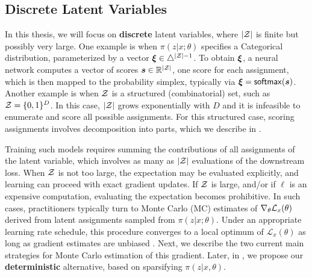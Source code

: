 \subsection{Discrete Latent Variables}\label{sec:discrete_lvm_bg}

\noindent In this thesis, we will focus on \textbf{discrete} latent variables, where
$|\mathcal{Z}|$ is finite but possibly very large. One example is when
$\pi(z|x;\theta)$ specifies a Categorical distribution, parameterized by a
vector $\bm{\xi} \in \triangle^{|\mathcal{Z}|-1}$. To obtain $\bm{\xi}$, a neural network
computes a vector of scores $\bm{s} \in \mathbb{R}^{|\mathcal{Z}|}$, one score
for each assignment, which is then mapped to the probability simplex,
typically via $\bm{\xi} = \operatorname*{\mathsf{softmax}}(\bm{s})$. Another example is when $\mathcal{Z}$ is
a structured (combinatorial) set, such as $\mathcal{Z} = \{0, 1\}^D$. In this
case, $|\mathcal{Z}|$ grows exponentially with $D$ and it is infeasible to
enumerate and score all possible assignments. For this structured
case, scoring assignments involves decomposition into parts, which
we describe in .

Training such models requires summing the contributions of all
assignments of the latent variable, which involves as many as $|\mathcal{Z}|$
evaluations of the downstream loss. When $\mathcal{Z}$ is not too large, the
expectation may be evaluated explicitly, and learning can proceed
with exact gradient updates. If $\mathcal{Z}$ is large, and/or if $\ell$ is
an expensive computation, evaluating the expectation becomes
prohibitive. In such cases, practitioners typically turn to Monte Carlo (MC)
estimates of $\nabla_\theta \mathcal{L}_x(\theta)$ derived from latent
assignments sampled from $\pi(z|x;\theta)$. Under an appropriate
learning rate schedule, this procedure converges to a local optimum
of $\mathcal L_x(\theta)$ as long as gradient estimates are unbiased
\citep{robbins1951stochastic}. Next, we describe the two current main
strategies for Monte Carlo estimation of this gradient. Later, in
, we propose our
\textbf{deterministic} alternative, based on sparsifying $\pi(z| x,
    \theta)$.

